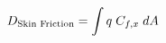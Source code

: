 \documentclass[preview]{standalone}
\begin{document}
\begin{align*}
\special{dvisvgm:raw <g id='unique000'>}D_{\text{Skin Friction}} = \int q \; C_{f,x} \; dA\special{dvisvgm:raw </g>}
\end{align*}
\end{document}
